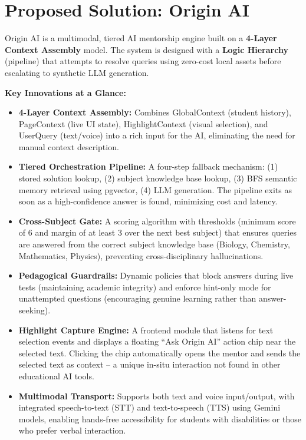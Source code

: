 \section{Proposed Solution: Origin AI}

Origin AI is a multimodal, tiered AI mentorship engine built on a \textbf{4-Layer Context Assembly} model. The system is designed with a \textbf{Logic Hierarchy} (pipeline) that attempts to resolve queries using zero-cost local assets before escalating to synthetic LLM generation.

\textbf{Key Innovations at a Glance:}

\begin{itemize}
    \item \textbf{4-Layer Context Assembly:} Combines GlobalContext (student history), PageContext (live UI state), HighlightContext (visual selection), and UserQuery (text/voice) into a rich input for the AI, eliminating the need for manual context description.
    \item \textbf{Tiered Orchestration Pipeline:} A four-step fallback mechanism: (1) stored solution lookup, (2) subject knowledge base lookup, (3) BFS semantic memory retrieval using pgvector, (4) LLM generation. The pipeline exits as soon as a high-confidence answer is found, minimizing cost and latency.
    \item \textbf{Cross-Subject Gate:} A scoring algorithm with thresholds (minimum score of 6 and margin of at least 3 over the next best subject) that ensures queries are answered from the correct subject knowledge base (Biology, Chemistry, Mathematics, Physics), preventing cross-disciplinary hallucinations.
    \item \textbf{Pedagogical Guardrails:} Dynamic policies that block answers during live tests (maintaining academic integrity) and enforce hint-only mode for unattempted questions (encouraging genuine learning rather than answer-seeking).
    \item \textbf{Highlight Capture Engine:} A frontend module that listens for text selection events and displays a floating ``Ask Origin AI'' action chip near the selected text. Clicking the chip automatically opens the mentor and sends the selected text as context – a unique in-situ interaction not found in other educational AI tools.
    \item \textbf{Multimodal Transport:} Supports both text and voice input/output, with integrated speech-to-text (STT) and text-to-speech (TTS) using Gemini models, enabling hands-free accessibility for students with disabilities or those who prefer verbal interaction.
\end{itemize}


